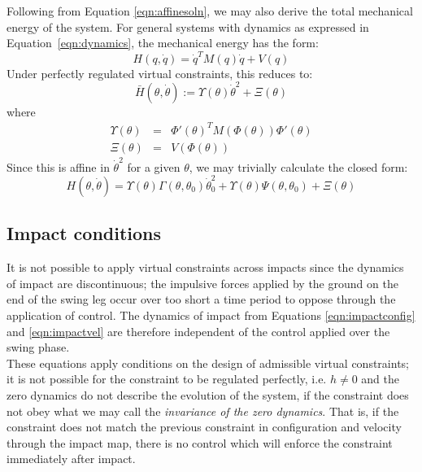 Following from Equation \ref{eqn:affinesoln}, we may also derive the total mechanical energy of the system. For general systems with dynamics as expressed in Equation~\ref{eqn:dynamics}, the mechanical energy has the form:
\begin{equation}
	H\left(q,\dot{q}\right) = \dot{q}^TM(q)\dot{q} + V(q)
\end{equation}
Under perfectly regulated virtual constraints, this reduces to:
\begin{equation}
	\bar{H}\left(\theta,\dot{\theta}\right) := \Upsilon(\theta)\dot{\theta}^2 + \Xi(\theta)
\end{equation}
where
\begin{eqnarray*}
	\Upsilon(\theta) &=& \Phi'(\theta)^TM\left(\Phi(\theta)\right)\Phi'(\theta) \\
	\Xi(\theta) &=& V\left(\Phi(\theta)\right)
\end{eqnarray*}
Since this is affine in $\dot{\theta}^2$ for a given $\theta$, we may trivially calculate the closed form:
\begin{equation}
	H\left(\theta, \dot{\theta}\right) =
	\Upsilon(\theta)\Gamma\left(\theta,\theta_0\right)\dot{\theta}_0^2 +
	\Upsilon(\theta)\Psi\left(\theta,\theta_0\right) + \Xi(\theta)
\end{equation}

\subsection{Impact conditions} \label{sec:impact}
It is not possible to apply virtual constraints across impacts since the dynamics of impact are discontinuous; the impulsive forces applied by the ground on the end of the swing leg occur over too short a time period to oppose through the application of control. The dynamics of impact from Equations \ref{eqn:impactconfig} and \ref{eqn:impactvel} are therefore independent of the control applied over the swing phase. \\

These equations apply conditions on the design of admissible virtual constraints; it is not possible for the constraint to be regulated perfectly, i.e. $h \neq 0$ and the zero dynamics do not describe the evolution of the system, if the constraint does not obey what we may call the \textit{invariance of the zero dynamics}. That is, if the constraint does not match the previous constraint in configuration and velocity through the impact map, there is no control which will enforce the constraint immediately after impact. \\

